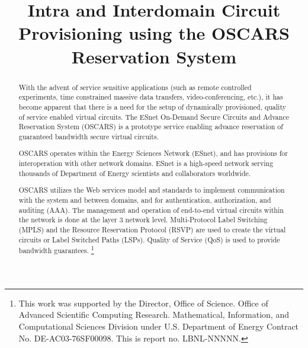 \documentclass[conference]{IEEEtran}
\begin{document}
\title{Intra and Interdomain Circuit Provisioning using the OSCARS Reservation System}

% 
\author{
}

\maketitle

\begin{abstract}
With the advent of service sensitive applications (such as remote controlled 
experiments, time constrained massive data transfers, video-conferencing, etc.),
it has become apparent that there is a need for the setup of dynamically 
provisioned, quality of service enabled virtual circuits.
The ESnet On-Demand Secure Circuits and Advance Reservation System (OSCARS) is 
a prototype service enabling advance reservation of guaranteed bandwidth 
secure virtual circuits.

OSCARS operates within the Energy Sciences Network (ESnet), and has
provisions for interoperation with other network domains.
ESnet is a high-speed network serving thousands 
of Department of Energy scientists and collaborators worldwide.

OSCARS utilizes the Web services model and standards to implement communication
with the system and between domains, and for authentication, authorization,
and auditing (AAA).  The management and operation of end-to-end virtual circuits 
within the network is done at the layer 3 network level.  
Multi-Protocol Label Switching (MPLS) and the Resource Reservation Protocol (RSVP)
are used to create the virtual circuits or Label Switched Paths (LSPs). Quality of Service (QoS) is used to 
provide bandwidth guarantees.
\footnote{
This work was supported by the Director, Office of Science. Office of
Advanced Scientific Computing Research. Mathematical, Information, and
Computational Sciences Division under U.S. Department of
Energy Contract No. DE-AC03-76SF00098. This is report no. LBNL-NNNNN.
}
\end{abstract}
\end{document}
